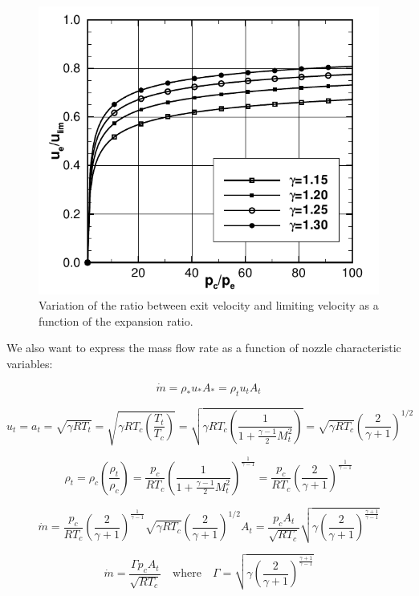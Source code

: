 \documentclass[
  ignorenonframetext,
]{beamer}
\begin{document}
\begin{frame}
\begin{figure}

{\centering \includegraphics{figs/fig16.3.png}

}

\caption{Variation of the ratio between exit velocity and limiting
velocity as a function of the expansion ratio.}

\end{figure}
\end{frame}

\begin{frame}
We also want to express the mass flow rate as a function of nozzle
characteristic variables:

\[
\dot{m} = \rho_* u_* A_* = \rho_t u_t A_t
\]

\[
u_t = a_t = \sqrt{\gamma R T_t} = \sqrt{\gamma R T_c \left(\frac{T_t}{T_c}\right)} = \sqrt{\gamma R T_c \left(\frac{1}{1+\frac{\gamma - 1}{2}M_t^2}\right)} = \sqrt{\gamma R T_c} \left(\frac{2}{\gamma + 1}\right)^{1/2}
\]

\[ \rho_t = \rho_c \left(\frac{\rho_t}{\rho_c}\right) = \frac{p_c}{R T_c} \left(\frac{1}{1+\frac{\gamma - 1}{2}M_t^2}\right)^\frac{1}{\gamma - 1} = \frac{p_c}{RT_c} \left(\frac{2}{\gamma + 1}\right)^\frac{1}{\gamma - 1} 
\]

\[
\dot{m} = \frac{p_c}{RT_c} \left(\frac{2}{\gamma + 1}\right)^\frac{1}{\gamma - 1} \sqrt{\gamma R T_c} \left(\frac{2}{\gamma + 1}\right)^{1/2} A_t = \frac{p_c A_t}{\sqrt{RT_c}} \sqrt{\gamma \left(\frac{2}{\gamma + 1}\right)^\frac{\gamma + 1}{\gamma - 1}}
\]

\[\dot{m} = \frac{\Gamma p_c A_t}{\sqrt{R T_c}} \quad \text{where} \quad \Gamma = \sqrt{\gamma \left(\frac{2}{\gamma + 1} \right)^\frac{\gamma + 1}{\gamma - 1}}\]
\end{frame}
\end{document}
